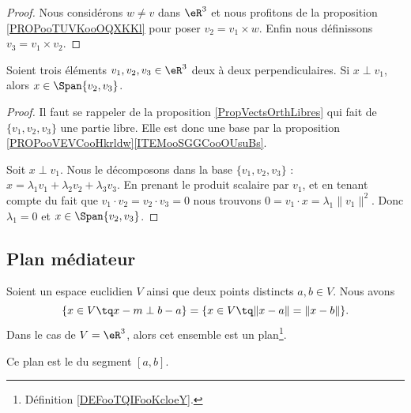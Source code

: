 \begin{proof}
	Nous considérons \( w\neq v\) dans \( \eR^3\) et nous profitons de la proposition \ref{PROPooTUVKooOQXKKl} pour poser \( v_2=v_1\times w\). Enfin nous définissons \( v_3=v_1\times v_2\).
\end{proof}

\begin{lemma}       \label{LEMooGXGCooDfgbqG}
	Soient trois éléments \( v_1,v_2,v_3\in \eR^3\) deux à deux perpendiculaires. Si \( x\perp v_1\), alors \( x\in \Span\{ v_2,v_3 \}\).
\end{lemma}

\begin{proof}
	Il faut se rappeler de la proposition \ref{PropVectsOrthLibres} qui fait de \( \{ v_1,v_2,v_3 \}\) une partie libre. Elle est donc une base par la proposition \ref{PROPooVEVCooHkrldw}\ref{ITEMooSGGCooOUsuBs}.

	Soit \( x\perp v_1\). Nous le décomposons dans la base \( \{ v_1,v_2,v_3 \}\) : \( x=\lambda_1 v_1+\lambda_2 v_2+\lambda_3v_3\). En prenant le produit scalaire par \( v_1\), et en tenant compte du fait que \( v_1\cdot v_2=v_2\cdot v_3=0\) nous trouvons \( 0=v_1\cdot x=\lambda_1\| v_1 \|^2\). Donc \( \lambda_1=0\) et \( x\in \Span\{ v_2,v_3 \}\).
\end{proof}

\subsection{Plan médiateur}

\begin{proposition}
	Soient un espace euclidien \( V\) ainsi que deux points distincts \( a,b\in V\). Nous avons
	\begin{equation}
		\{ x\in V\tq x-m\perp b-a \}=\{ x\in V\tq \| x-a \|=\| x-b \| \}.
	\end{equation}
	Dans le cas de \( V=\eR^3\), alors cet ensemble est un plan\footnote{Définition \ref{DEFooTQIFooKcloeY}.}.

	Ce plan est le  du segment \( [a,b]\).
\end{proposition}

